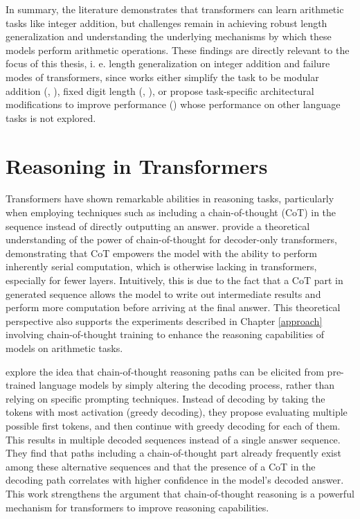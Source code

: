 
In summary, the literature demonstrates that transformers can learn arithmetic tasks like integer addition, but challenges remain in achieving robust length generalization and understanding the underlying mechanisms by which these models perform arithmetic operations. These findings are directly relevant to the focus of this thesis, i. e. length generalization on integer addition and failure modes of transformers, since works either simplify the task to be modular addition (\parencite{nanda_modular_fourier}, \parencite{pizza_clock}), fixed digit length (\parencite{lee_teaching_2023}, \parencite{quirke_understanding_2023}), or propose task-specific architectural modifications to improve performance (\parencite{mcleish_transformers_2024}) whose performance on other language tasks is not explored.

\section{Reasoning in Transformers}\label{sec:sota_reasoning_in_transformers}

Transformers have shown remarkable abilities in reasoning tasks, particularly when employing techniques such as including a chain-of-thought (CoT) in the sequence instead of directly outputting an answer. \cite{li_chain_2024} provide a theoretical understanding of the power of chain-of-thought for decoder-only transformers, demonstrating that CoT empowers the model with the ability to perform inherently serial computation, which is otherwise lacking in transformers, especially for fewer layers. Intuitively, this is due to the fact that a CoT part in generated sequence allows the model to write out intermediate results and perform more computation before arriving at the final answer. This theoretical perspective also supports the experiments described in Chapter \ref{approach} involving chain-of-thought training to enhance the reasoning capabilities of models on arithmetic tasks.

\cite{wang_cot_2024} explore the idea that chain-of-thought reasoning paths can be elicited from pre-trained language models by simply altering the decoding process, rather than relying on specific prompting techniques. Instead of decoding by taking the tokens with most activation (greedy decoding), they propose evaluating multiple possible first tokens, and then continue with greedy decoding for each of them. This results in multiple decoded sequences instead of a single answer sequence. They find that paths including a chain-of-thought part already frequently exist among these alternative sequences and that the presence of a CoT in the decoding path correlates with higher confidence in the model's decoded answer. This work strengthens the argument that chain-of-thought reasoning is a powerful mechanism for transformers to improve reasoning capabilities.

